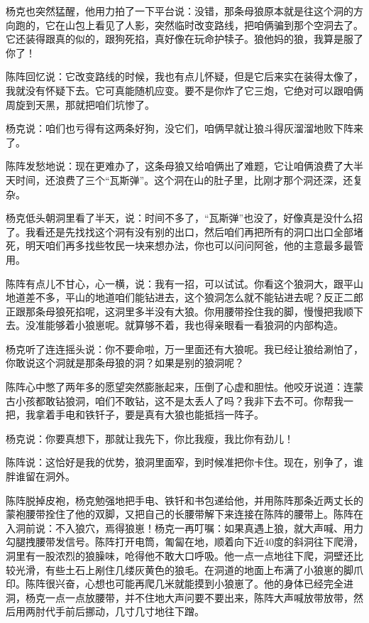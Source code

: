 \par 杨克也突然猛醒，他用力拍了一下平台说：没错，那条母狼原本就是往这个洞的方向跑的，它在山包上看见了人影，突然临时改变路线，把咱俩骗到那个空洞去了。它还装得跟真的似的，跟狗死掐，真好像在玩命护犊子。狼他妈的狼，我算是服了你了！
\par 陈阵回忆说：它改变路线的时候，我也有点儿怀疑，但是它后来实在装得太像了，我就没有怀疑下去。它可真能随机应变。要不是你炸了它三炮，它绝对可以跟咱俩周旋到天黑，那就把咱们坑惨了。
\par 杨克说：咱们也亏得有这两条好狗，没它们，咱俩早就让狼斗得灰溜溜地败下阵来了。
\par 陈阵发愁地说：现在更难办了，这条母狼又给咱俩出了难题，它让咱俩浪费了大半天时间，还浪费了三个“瓦斯弹”。这个洞在山的肚子里，比刚才那个洞还深，还复杂。
\par 杨克低头朝洞里看了半天，说：时间不多了，“瓦斯弹”也没了，好像真是没什么招了。我看还是先找找这个洞有没有别的出口，然后咱们再把所有的洞口出口全部堵死，明天咱们再多找些牧民一块来想办法，你也可以问问阿爸，他的主意最多最管用。
\par 陈阵有点儿不甘心，心一横，说：我有一招，可以试试。你看这个狼洞大，跟平山地道差不多，平山的地道咱们能钻进去，这个狼洞怎么就不能钻进去呢？反正二郎正跟那条母狼死掐呢，这洞里多半没有大狼。你用腰带拴住我的脚，慢慢把我顺下去。没准能够着小狼崽呢。就算够不着，我也得亲眼看一看狼洞的内部构造。
\par 杨克听了连连摇头说：你不要命啦，万一里面还有大狼呢。我已经让狼给涮怕了，你敢说这个洞就是那条母狼的洞？如果是别的狼洞呢？
\par 陈阵心中憋了两年多的愿望突然膨胀起来，压倒了心虚和胆怯。他咬牙说道：连蒙古小孩都敢钻狼洞，咱们不敢钻，这不是太丢人了吗？我非下去不可。你帮我一把，我拿着手电和铁钎子，要是真有大狼也能抵挡一阵子。
\par 杨克说：你要真想下，那就让我先下，你比我瘦，我比你有劲儿！
\par 陈阵说：这恰好是我的优势，狼洞里面窄，到时候准把你卡住。现在，别争了，谁胖谁留在洞外。
\par 陈阵脱掉皮袍，杨克勉强地把手电、铁钎和书包递给他，并用陈阵那条近两丈长的蒙袍腰带拴住了他的双脚，又把自己的长腰带解下来连接在陈阵的腰带上。陈阵在入洞前说：不入狼穴，焉得狼崽！杨克一再叮嘱：如果真遇上狼，就大声喊、用力勾腿拽腰带发信号。陈阵打开电筒，匍匐在地，顺着向下近40度的斜洞往下爬滑，洞里有一股浓烈的狼臊味，呛得他不敢大口呼吸。他一点一点地往下爬，洞壁还比较光滑，有些土石上剐住几缕灰黄色的狼毛。在洞道的地面上布满了小狼崽的脚爪印。陈阵很兴奋，心想也可能再爬几米就能摸到小狼崽了。他的身体已经完全进洞，杨克一点一点放腰带，并不住地大声问要不要出来，陈阵大声喊放带放带，然后用两肘代手前后挪动，几寸几寸地往下蹭。
